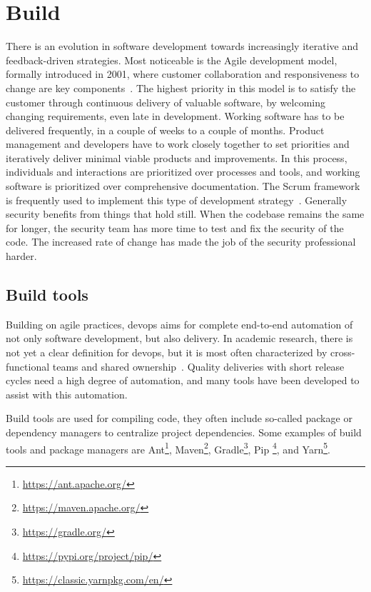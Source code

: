 \section{Build}
\label{sec:related-build}

There is an evolution in software development towards increasingly iterative and feedback-driven strategies.
Most noticeable is the Agile development model, formally introduced in 2001, where customer collaboration and responsiveness to change are key components~\cite{fowler2001agile}.
The highest priority in this model is to satisfy the customer through continuous delivery of valuable software, by welcoming changing requirements, even late in development.
Working software has to be delivered frequently, in a couple of weeks to a couple of months.
Product management and developers have to work closely together to set priorities and iteratively deliver minimal viable products and improvements.
In this process, individuals and interactions are prioritized over processes and tools, and working software is prioritized over comprehensive documentation.
The Scrum framework is frequently used to implement this type of development strategy~\cite{schwaber2004agile}.
Generally security benefits from things that hold still.
When the codebase remains the same for longer, the security team has more time to test and fix the security of the code.
The increased rate of change has made the job of the security professional harder.

\subsection{Build tools}
Building on agile practices, \gls{devops} aims for complete end-to-end automation of not only software development, but also delivery.
In academic research, there is not yet a clear definition for \gls{devops}, but it is most often characterized by cross-functional teams and shared ownership~\cite{erich2017qualitative,ebert2016devops}.
Quality deliveries with short release cycles need a high degree of automation, and many tools have been developed to assist with this automation.

Build tools are used for compiling code, they often include so-called package or dependency managers to centralize project dependencies.
Some examples of build tools and package managers are Ant\footnote{\url{https://ant.apache.org/}}, Maven\footnote{\url{https://maven.apache.org/}}, Gradle\footnote{\url{https://gradle.org/}},
Pip \footnote{\url{https://pypi.org/project/pip/}}, and Yarn\footnote{\url{https://classic.yarnpkg.com/en/}}.

